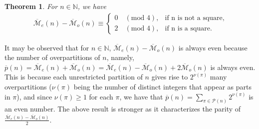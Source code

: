 \documentclass[12pt,reqno]{amsart}
\renewcommand{\(}{\left\(}
\renewcommand{\)}{\right\)}
\renewcommand{\[}{\left\[}
\renewcommand{\]}{\right\]}
\numberwithin{equation}{section}
\theoremstyle{plain}
\newtheorem{theorem}{Theorem}[section]
\begin{document}
\begin{theorem} \label{OP_1(n,m)(w=-1)GFN}
For $n \in \mathbb{N}$, we have
\begin{align*}
\overline{\mathcal{M}}_e(n)-\overline{\mathcal{M}}_o(n)\equiv
    \begin{cases}
            0 \quad(\text{mod 4}), &         \text{if n is not a square},\\
            2\quad(\text{mod 4}), &         \text{if n is a square}.
    \end{cases}
\end{align*}
\end{theorem}
It may be observed that for $n \in \mathbb{N}$, $\overline{\mathcal{M}}_e(n)-\overline{\mathcal{M}}_o(n)$ is always even because the number of overpartitions of $n$, namely, $\overline{p}(n) = \overline{\mathcal{M}}_e(n) + \overline{\mathcal{M}}_o(n) = \overline{\mathcal{M}}_e(n) - \overline{\mathcal{M}}_o(n) + 2 \overline{\mathcal{M}}_o(n)$ is always even. This is because each unrestricted partition of $n$ gives rise to $2^{\nu(\pi)}$ many overpartitions ($\nu(\pi)$ being the number of distinct integers that appear as parts in $\pi$), and since $\nu(\pi) \geq 1$ for each $\pi$, we have that $\overline{p}(n) = \sum_{\pi \in \mathcal{P}(n)} 2^{\nu(\pi)}$ is an even number. The above result is stronger as it characterizes the parity of $\frac{\overline{\mathcal{M}}_e(n)-\overline{\mathcal{M}}_o(n)}{2}$.
\end{document}
